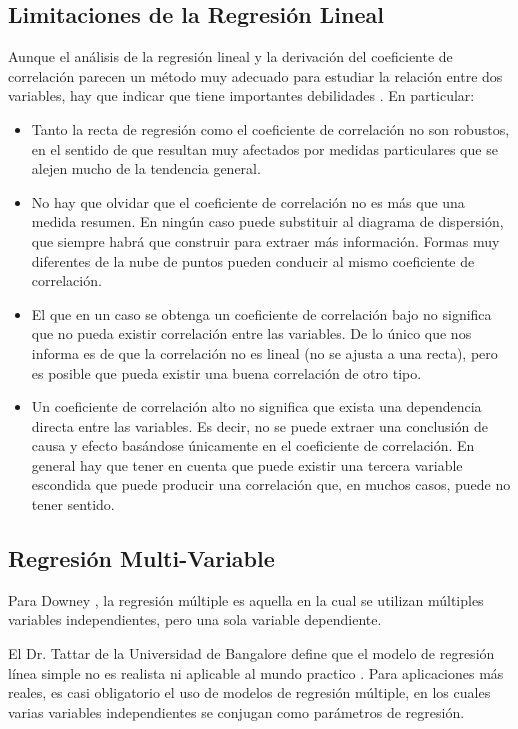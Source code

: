 \subsection{Limitaciones de la Regresión Lineal}
Aunque el análisis de la regresión lineal y la derivación del coeficiente de correlación parecen un método muy adecuado para estudiar la relación entre dos variables, hay que indicar que tiene importantes debilidades \cite{estadisticaBasica}. En particular:

\begin{itemize}
	\item Tanto la recta de regresión como el coeficiente de correlación no son robustos, en el sentido de que resultan muy afectados por medidas particulares que se alejen mucho de la tendencia general.
	\item No hay que olvidar que el coeficiente de correlación no es más que una medida resumen. En ningún caso puede substituir al diagrama de dispersión, que siempre habrá que construir para extraer más información. Formas muy diferentes de la nube de puntos pueden conducir al mismo coeficiente de correlación.
	\item El que en un caso se obtenga un coeficiente de correlación bajo no significa que no pueda existir correlación entre las variables. De lo único que nos informa es de que la correlación no es lineal (no se ajusta a una recta), pero es posible que pueda existir una buena correlación de otro tipo.
	\item Un coeficiente de correlación alto no significa que exista una dependencia directa entre las variables. Es decir, no se puede extraer una conclusión de causa y efecto basándose únicamente en el coeficiente de correlación. En general hay que tener en cuenta que puede existir una tercera variable escondida
	que puede producir una correlación que, en muchos casos, puede no tener sentido.
\end{itemize}

\subsection{Regresión Multi-Variable}
Para Downey \cite{thinkStats}, la regresión múltiple es aquella en la cual se utilizan múltiples variables independientes, pero una sola variable dependiente. 

El Dr. Tattar de la Universidad de Bangalore define que el modelo de regresión línea simple no es realista ni aplicable al mundo practico \cite{narayanachar}. Para aplicaciones más reales, es casi obligatorio el uso de modelos de regresión múltiple, en los cuales varias variables independientes se conjugan como parámetros de regresión. 

